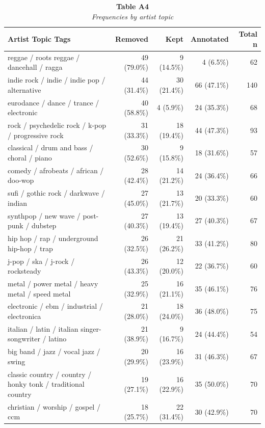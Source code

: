 \begin{table}
\caption*{
{\large \textbf{Table A4}} \\ 
{\small \emph{Frequencies by artist topic}}
} 
\fontsize{12.0pt}{14.4pt}\selectfont
\begin{tabular*}{\linewidth}{@{\extracolsep{\fill}}lrrrr}
\toprule
{Artist Topic Tags} & Removed & Kept & Annotated & Total n \\ 
\midrule\addlinespace[2.5pt]
reggae / roots reggae / dancehall / ragga & 49 (79.0\%) & 9 (14.5\%) & 4 (6.5\%) & 62 \\ 
indie rock / indie / indie pop / alternative & 44 (31.4\%) & 30 (21.4\%) & 66 (47.1\%) & 140 \\ 
eurodance / dance / trance / electronic & 40 (58.8\%) & 4 (5.9\%) & 24 (35.3\%) & 68 \\ 
rock / psychedelic rock / k-pop / progressive rock & 31 (33.3\%) & 18 (19.4\%) & 44 (47.3\%) & 93 \\ 
classical / drum and bass / choral / piano & 30 (52.6\%) & 9 (15.8\%) & 18 (31.6\%) & 57 \\ 
comedy / afrobeats / african / doo-wop & 28 (42.4\%) & 14 (21.2\%) & 24 (36.4\%) & 66 \\ 
sufi / gothic rock / darkwave / indian & 27 (45.0\%) & 13 (21.7\%) & 20 (33.3\%) & 60 \\ 
synthpop / new wave / post-punk / dubstep & 27 (40.3\%) & 13 (19.4\%) & 27 (40.3\%) & 67 \\ 
hip hop / rap / underground hip-hop / trap & 26 (32.5\%) & 21 (26.2\%) & 33 (41.2\%) & 80 \\ 
j-pop / ska / j-rock / rocksteady & 26 (43.3\%) & 12 (20.0\%) & 22 (36.7\%) & 60 \\ 
metal / power metal / heavy metal / speed metal & 25 (32.9\%) & 16 (21.1\%) & 35 (46.1\%) & 76 \\ 
electronic / ebm / industrial / electronica & 21 (28.0\%) & 18 (24.0\%) & 36 (48.0\%) & 75 \\ 
italian / latin / italian singer-songwriter / latino & 21 (38.9\%) & 9 (16.7\%) & 24 (44.4\%) & 54 \\ 
big band / jazz / vocal jazz / swing & 20 (29.9\%) & 16 (23.9\%) & 31 (46.3\%) & 67 \\ 
classic country / country / honky tonk / traditional country & 19 (27.1\%) & 16 (22.9\%) & 35 (50.0\%) & 70 \\ 
christian / worship / gospel / ccm & 18 (25.7\%) & 22 (31.4\%) & 30 (42.9\%) & 70 \\ 

\end{tabular*}
\end{table}
